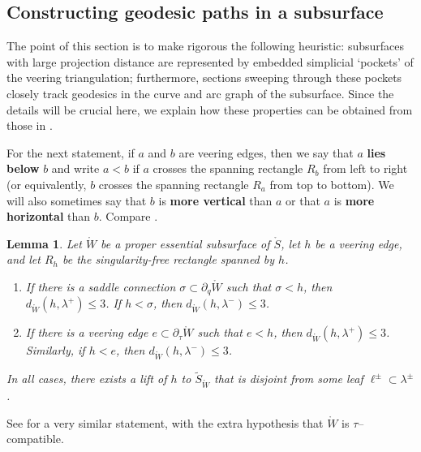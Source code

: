 \documentclass[11pt,letterpaper]{amsart}
\newcommand{\wt}{\widetilde}
\newcommand{\mr}{\mathring}
\newcommand{\bdy}{\partial} %
\newcommand{\psub}{\mr W}
\numberwithin{equation}{section}
\newtheorem{lemma}[theorem]{Lemma}
\theoremstyle{definition}
\newcommand{\define}[1]{\textbf{#1}}
\begin{document}
\subsection{Constructing geodesic paths in a subsurface}
The point of this section is to make rigorous the following heuristic: subsurfaces with large projection distance are represented by embedded simplicial `pockets' of the veering triangulation; furthermore, sections sweeping through these pockets closely track geodesics in the curve and arc graph of the subsurface. Since the details will be crucial here, we explain how these properties can be obtained from those in \cite{MinskyTaylor:FiberedFaces}.

For the next statement, if $a$ and $b$ are veering edges, then we say that $a$ \define{lies below} $b$ and write $a<b$ if $a$ crosses the spanning rectangle $R_b$ from left to right (or equivalently, $b$ crosses the spanning rectangle $R_a$ from top to bottom). We will also sometimes say that $b$ is \define{more vertical} than $a$ or that $a$ is \define{more horizontal} than $b$. Compare .

\begin{lemma}\label{lem:above/below}
Let $\psub$ be a proper essential subsurface of $\mr S$, let $h$ be a veering edge, and let $R_h$ be the singularity-free rectangle spanned by $h$.
\begin{enumerate}%
\item
\label{Itm:qAbove} If there is a saddle connection $\sigma \subset \bdy_q \psub$ such that $\sigma < h$, 
then $d_{\psub}(h,\lambda^+) \leq 3$. If $h < \sigma$, then $d_{\psub}(h,\lambda^-) \leq 3$.
\item
\label{Itm:tauAbove} If there is a veering edge $e \subset \bdy_\tau \psub$ such that $e < h$, then $d_{\psub}(h,\lambda^+) \leq 3$. Similarly, if $h < e$, then $d_{\psub}(h,\lambda^-) \leq 3$.
\end{enumerate}
In all cases, there exists a lift of $h$ to $\wt S_{\psub}$ that is disjoint from some  leaf $\ell^\pm \subset \lambda^\pm$. 
\end{lemma}


See \cite[Lemma 6.3]{MinskyTaylor:FiberedFaces} for a very similar statement, with the extra hypothesis that $\psub$ is $\tau$--compatible.
\end{document}
